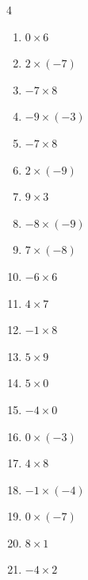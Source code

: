 \begin{multicols}{4}
\begin{enumerate}
  \item $0\times 6$
        \phantom{$=0$}

  \item $2\times (-7)$
        \phantom{$=-14$}

  \item $-7\times 8$
        \phantom{$=-56$}

  \item $-9\times (-3)$
        \phantom{$=27$}

  \item $-7\times 8$
        \phantom{$=-56$}

  \item $2\times (-9)$
        \phantom{$=-18$}

  \item $9\times 3$
        \phantom{$=27$}

  \item $-8\times (-9)$
        \phantom{$=72$}

  \item $7\times (-8)$
        \phantom{$=-56$}

  \item $-6\times 6$
        \phantom{$=-36$}

  \item $4\times 7$
        \phantom{$=28$}

  \item $-1\times 8$
        \phantom{$=-8$}

  \item $5\times 9$
        \phantom{$=45$}

  \item $5\times 0$
        \phantom{$=0$}

\columnbreak %

  \item $-4\times 0$
        \phantom{$=0$}

  \item $0\times (-3)$
        \phantom{$=0$}

  \item $4\times 8$
        \phantom{$=32$}

  \item $-1\times (-4)$
        \phantom{$=4$}

  \item $0\times (-7)$
        \phantom{$=0$}

  \item $8\times 1$
        \phantom{$=8$}

  \item $-4\times 2$
        \phantom{$=-8$}


\end{enumerate}
\end{multicols}
